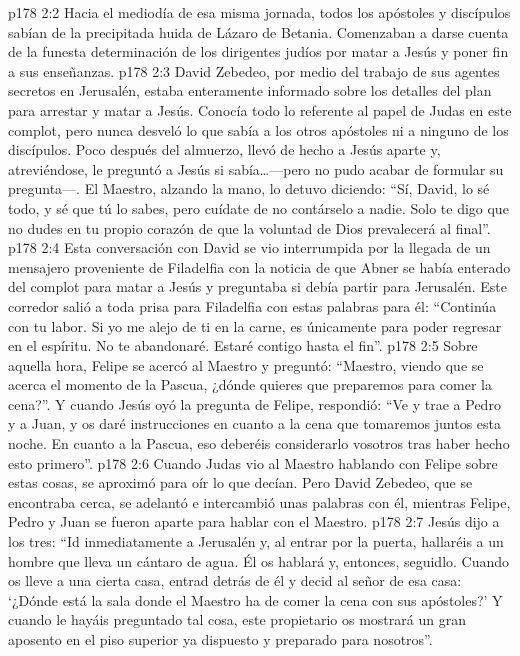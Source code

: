 \vs p178 2:2 Hacia el mediodía de esa misma jornada, todos los apóstoles y discípulos sabían de la precipitada huida de Lázaro de Betania. Comenzaban a darse cuenta de la funesta determinación de los dirigentes judíos por matar a Jesús y poner fin a sus enseñanzas.
\vs p178 2:3 David Zebedeo, por medio del trabajo de sus agentes secretos en Jerusalén, estaba enteramente informado sobre los detalles del plan para arrestar y matar a Jesús. Conocía todo lo referente al papel de Judas en este complot, pero nunca desveló lo que sabía a los otros apóstoles ni a ninguno de los discípulos. Poco después del almuerzo, llevó de hecho a Jesús aparte y, atreviéndose, le preguntó a Jesús si sabía\ldots ---pero no pudo acabar de formular su pregunta---. El Maestro, alzando la mano, lo detuvo diciendo: “Sí, David, lo sé todo, y sé que tú lo sabes, pero cuídate de no contárselo a nadie. Solo te digo que no dudes en tu propio corazón de que la voluntad de Dios prevalecerá al final”.
\vs p178 2:4 Esta conversación con David se vio interrumpida por la llegada de un mensajero proveniente de Filadelfia con la noticia de que Abner se había enterado del complot para matar a Jesús y preguntaba si debía partir para Jerusalén. Este corredor salió a toda prisa para Filadelfia con estas palabras para él: “Continúa con tu labor. Si yo me alejo de ti en la carne, es únicamente para poder regresar en el espíritu. No te abandonaré. Estaré contigo hasta el fin”.
\vs p178 2:5 Sobre aquella hora, Felipe se acercó al Maestro y preguntó: “Maestro, viendo que se acerca el momento de la Pascua, ¿dónde quieres que preparemos para comer la cena?”. Y cuando Jesús oyó la pregunta de Felipe, respondió: “Ve y trae a Pedro y a Juan, y os daré instrucciones en cuanto a la cena que tomaremos juntos esta noche. En cuanto a la Pascua, eso deberéis considerarlo vosotros tras haber hecho esto primero”.
\vs p178 2:6 Cuando Judas vio al Maestro hablando con Felipe sobre estas cosas, se aproximó para oír lo que decían. Pero David Zebedeo, que se encontraba cerca, se adelantó e intercambió unas palabras con él, mientras Felipe, Pedro y Juan se fueron aparte para hablar con el Maestro.
\vs p178 2:7 Jesús dijo a los tres: “Id inmediatamente a Jerusalén y, al entrar por la puerta, hallaréis a un hombre que lleva un cántaro de agua. Él os hablará y, entonces, seguidlo. Cuando os lleve a una cierta casa, entrad detrás de él y decid al señor de esa casa: ‘¿Dónde está la sala donde el Maestro ha de comer la cena con sus apóstoles?’ Y cuando le hayáis preguntado tal cosa, este propietario os mostrará un gran aposento en el piso superior ya dispuesto y preparado para nosotros”.
